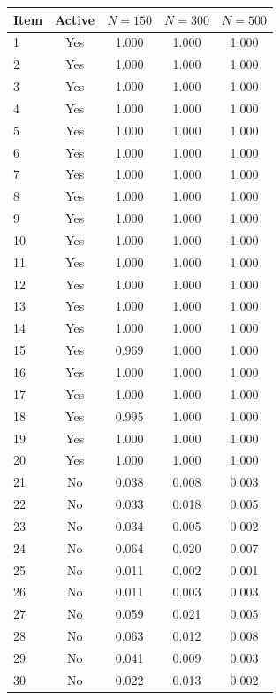 \begin{longtable}{lcccc}
  \toprule
Item & Active & $N = 150$ & $N = 300$ & $N = 500$ \\ 
  \midrule
1 & Yes & 1.000 & 1.000 & 1.000 \\ 
  2 & Yes & 1.000 & 1.000 & 1.000 \\ 
  3 & Yes & 1.000 & 1.000 & 1.000 \\ 
  4 & Yes & 1.000 & 1.000 & 1.000 \\ 
  5 & Yes & 1.000 & 1.000 & 1.000 \\ 
  6 & Yes & 1.000 & 1.000 & 1.000 \\ 
  7 & Yes & 1.000 & 1.000 & 1.000 \\ 
  8 & Yes & 1.000 & 1.000 & 1.000 \\ 
  9 & Yes & 1.000 & 1.000 & 1.000 \\ 
  10 & Yes & 1.000 & 1.000 & 1.000 \\ 
  11 & Yes & 1.000 & 1.000 & 1.000 \\ 
  12 & Yes & 1.000 & 1.000 & 1.000 \\ 
  13 & Yes & 1.000 & 1.000 & 1.000 \\ 
  14 & Yes & 1.000 & 1.000 & 1.000 \\ 
  15 & Yes & 0.969 & 1.000 & 1.000 \\ 
  16 & Yes & 1.000 & 1.000 & 1.000 \\ 
  17 & Yes & 1.000 & 1.000 & 1.000 \\ 
  18 & Yes & 0.995 & 1.000 & 1.000 \\ 
  19 & Yes & 1.000 & 1.000 & 1.000 \\ 
  20 & Yes & 1.000 & 1.000 & 1.000 \\ 
  21 & No & 0.038 & 0.008 & 0.003 \\ 
  22 & No & 0.033 & 0.018 & 0.005 \\ 
  23 & No & 0.034 & 0.005 & 0.002 \\ 
  24 & No & 0.064 & 0.020 & 0.007 \\ 
  25 & No & 0.011 & 0.002 & 0.001 \\ 
  26 & No & 0.011 & 0.003 & 0.003 \\ 
  27 & No & 0.059 & 0.021 & 0.005 \\ 
  28 & No & 0.063 & 0.012 & 0.008 \\ 
  29 & No & 0.041 & 0.009 & 0.003 \\ 
  30 & No & 0.022 & 0.013 & 0.002 \\ 

\end{longtable}
